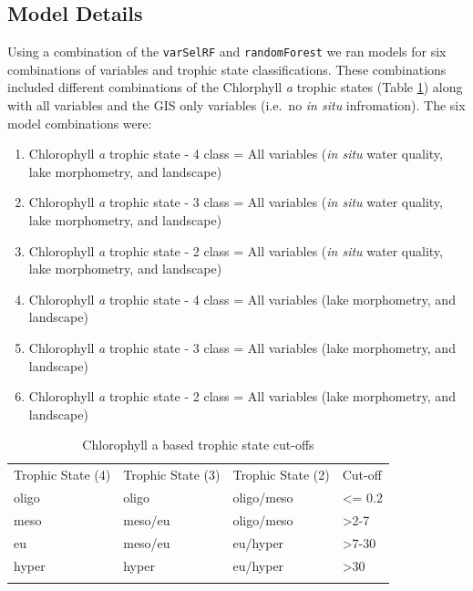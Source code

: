 \documentclass[11pt,]{article}
\begin{document}
\subsection{Model Details}\label{model-details}

Using a combination of the \texttt{varSelRF} and \texttt{randomForest}
we ran models for six combinations of variables and trophic state
classifications. These combinations included different combinations of
the Chlorphyll \emph{a} trophic states (Table
\ref{tab:trophicStateTable}) along with all variables and the GIS only
variables (i.e.~no \emph{in situ} infromation). The six model
combinations were:

\begin{enumerate}
\def\labelenumi{\arabic{enumi}.}
\itemsep1pt\parskip0pt
\item
  Chlorophyll \emph{a} trophic state - 4 class = All variables (\emph{in
  situ} water quality, lake morphometry, and landscape)
\item
  Chlorophyll \emph{a} trophic state - 3 class = All variables (\emph{in
  situ} water quality, lake morphometry, and landscape)
\item
  Chlorophyll \emph{a} trophic state - 2 class = All variables (\emph{in
  situ} water quality, lake morphometry, and landscape)
\item
  Chlorophyll \emph{a} trophic state - 4 class = All variables (lake
  morphometry, and landscape)
\item
  Chlorophyll \emph{a} trophic state - 3 class = All variables (lake
  morphometry, and landscape)
\item
  Chlorophyll \emph{a} trophic state - 2 class = All variables (lake
  morphometry, and landscape)
\end{enumerate}

\begin{longtable}[c]{@{}llll@{}}
\toprule\addlinespace
Trophic State (4) & Trophic State (3) & Trophic State (2) & Cut-off
\\\addlinespace
\midrule\endhead
oligo & oligo & oligo/meso & \textless{}= 0.2
\\\addlinespace
meso & meso/eu & oligo/meso & \textgreater{}2-7
\\\addlinespace
eu & meso/eu & eu/hyper & \textgreater{}7-30
\\\addlinespace
hyper & hyper & eu/hyper & \textgreater{}30
\\\addlinespace
\bottomrule
\addlinespace
\caption{Chlorophyll a based trophic state
cut-offs\label{tab:trophicStateTable}}
\end{longtable}
\end{document}

